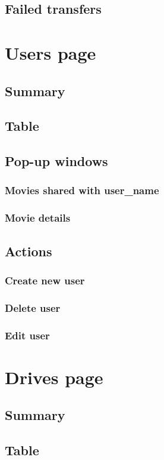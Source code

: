 \documentclass{report}
\begin{document}
\section{Failed transfers}

\chapter{Users page}
\section{Summary}
\section{Table}
\section{Pop-up windows}
\subsection{Movies shared with user\_name}
\subsection{Movie details}
\section{Actions}
\subsection{Create new user}
\subsection{Delete user}
\subsection{Edit user}

\chapter{Drives page}
\section{Summary}
\section{Table}
\end{document}

